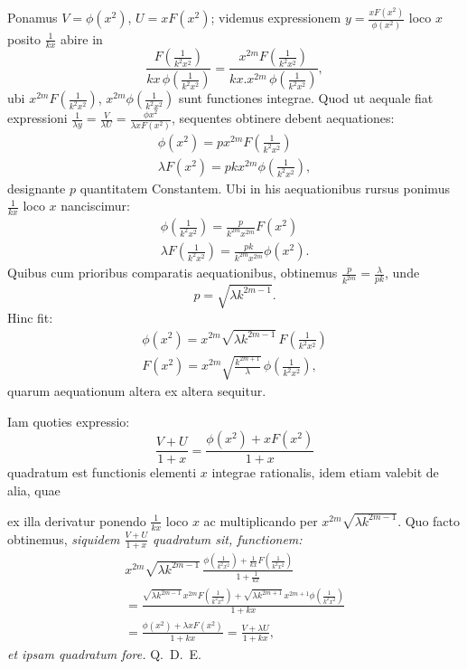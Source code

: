 \documentclass{article}
\begin{document}
Ponamus $V=\phi(x^{2})$, $U=xF(x^{2})$; videmus expressionem $y=\frac{xF(x^{2})}{\phi(x^{2})}$ loco $x$ posito $\frac{1}{kx}$ abire in
\[
\frac{F\left(\frac{1}{k^{2}x^{2}}\right)}{kx\,\phi\left(\frac{1}{k^{2}x^{2}}\right)}=\frac{x^{2m}F\left(\frac{1}{k^{2}x^{2}}\right)}{kx.x^{2m}\,\phi\left(\frac{1}{k^{2}x^{2}}\right)},
\]
ubi $x^{2m}F\left(\frac{1}{k^{2}x^{2}}\right)$, $x^{2m}\phi\left(\frac{1}{k^{2}x^{2}}\right)$ sunt functiones integrae. Quod ut aequale fiat expressioni $\frac{1}{\lambda y}=\frac{V}{\lambda U}=\frac{\phi x^{2}}{\lambda xF(x^{2})}$, sequentes obtinere debent aequationes:
\[
\begin{gathered}
\phi(x^{2})=px^{2m}F\left(\frac{1}{k^{2}x^{2}}\right)\\
\lambda F(x^{2})=pkx^{2m}\phi\left(\frac{1}{k^{2}x^{2}}\right),
\end{gathered}
\]
designante $p$ quantitatem Constantem. Ubi in his aequationibus rursus ponimus $\frac{1}{kx}$ loco $x$ nanciscimur:
\[
\begin{gathered}
\phi\left(\frac{1}{k^{2}x^{2}}\right)=\frac{p}{k^{2m}x^{2m}}F(x^{2})\\
\lambda F\left(\frac{1}{k^{2}x^{2}}\right)=\frac{pk}{k^{2m}x^{2m}}\phi(x^{2}).
\end{gathered}
\]
Quibus cum prioribus comparatis aequationibus, obtinemus $\frac{p}{k^{2m}}=\frac{\lambda}{pk}$, unde
\[
p=\sqrt{\lambda k^{2m-1}}.
\]
Hinc fit:
\[
\begin{gathered}
\phi(x^{2})=x^{2m}\sqrt{\lambda k^{2m-1}}\,F\left(\frac{1}{k^{2}x^{2}}\right)\\
F(x^{2})=x^{2m}\sqrt{\frac{k^{2m+1}}{\lambda}}\,\phi\left(\frac{1}{k^{2}x^{2}}\right),
\end{gathered}
\]
quarum aequationum altera ex altera sequitur.

Iam quoties expressio:
\[
\frac{V+U}{1+x}=\frac{\phi(x^{2})+xF(x^{2})}{1+x}
\]
quadratum est functionis elementi $x$ integrae rationalis, idem etiam valebit de alia, quae

ex illa derivatur ponendo $\frac{1}{kx}$ loco $x$ ac multiplicando per $x^{2m}\sqrt{\lambda k^{2m-1}}$. Quo facto obtinemus, \emph{siquidem $\frac{V+U}{1+x}$ quadratum sit, functionem:}
\[
\begin{gathered}
x^{2m}\sqrt{\lambda k^{2m-1}}\,\frac{\phi\left(\frac{1}{k^{2}x^{2}}\right)+\frac{1}{kx}F\left(\frac{1}{k^{2}x^{2}}\right)}{1+\frac{1}{kx}}\\
=\frac{\sqrt{\lambda k^{2m-1}}\,x^{2m}F\left(\frac{1}{k^{2}x^{2}}\right)+\sqrt{\lambda k^{2m+1}}\,x^{2m+1}\phi\left(\frac{1}{k^{2}x^{2}}\right)}{1+kx}\\
=\frac{\phi(x^{2})+\lambda xF(x^{2})}{1+kx}=\frac{V+\lambda U}{1+kx},
\end{gathered}
\]
\emph{et ipsam quadratum fore.} Q.\ D.\ E.
\end{document}
